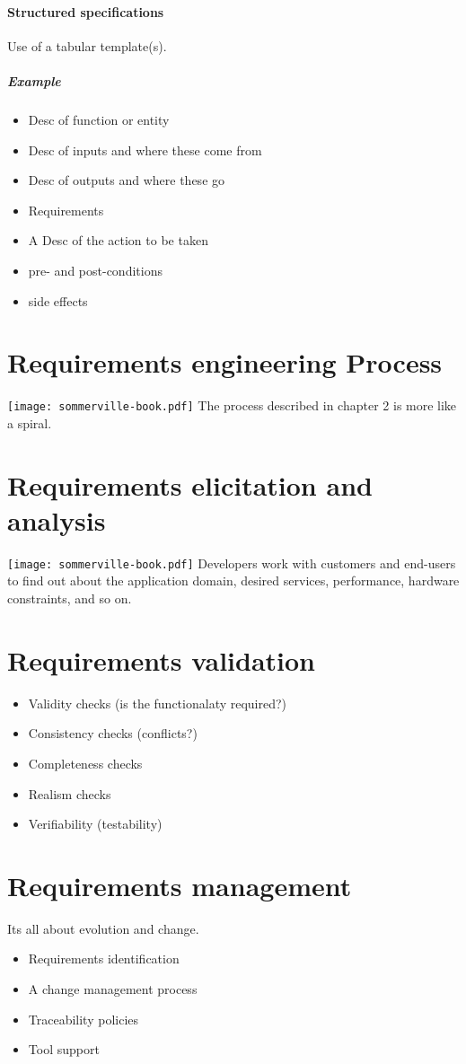 \documentclass[a4paper,11pt,twocolumn]{report}
\begin{document}
    \paragraph{Structured specifications}
    Use of a tabular template(s).
    \subparagraph{Example}
    \begin{itemize}
        \item Desc of function or entity
        \item Desc of inputs and where these come from
        \item Desc of outputs and where these go
        \item Requirements
        \item A Desc of the action to be taken
        \item pre- and post-conditions
        \item side effects
    \end{itemize}
    \section{Requirements engineering Process}
    \texttt{[image: sommerville-book.pdf]}
    The process described in chapter 2 is more like a spiral.
    \section{Requirements elicitation and analysis}
    \texttt{[image: sommerville-book.pdf]}
    Developers work with customers and end-users to find out about the
    application domain, desired services, performance, hardware constraints,
    and so on.
    \section{Requirements validation}
    \begin{itemize}
        \item Validity checks (is the functionalaty required?)
        \item Consistency checks (conflicts?)
        \item Completeness checks
        \item Realism checks
        \item Verifiability (testability)
    \end{itemize}
    \section{Requirements management}
    Its all about evolution and change.
    \begin{itemize}
        \item Requirements identification
        \item A change management process
        \item Traceability policies
        \item Tool support
    \end{itemize}
\end{document}
